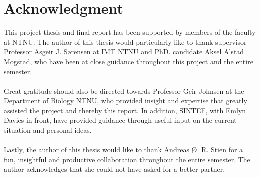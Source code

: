 \chapter*{Acknowledgment}
This project thesis and final report has been supported by members of the faculty at NTNU. The author of this thesis would particularly like to thank supervisor Professor Asgeir J. S{\o}rensen at IMT NTNU and PhD. candidate Aksel Alstad Mogstad, who have been at close guidance throughout this project and the entire semester. 
\\\\
Great gratitude should also be directed towards Professor Geir Johnsen at the Department of Biology NTNU, who provided insight and expertise that greatly assisted the project and thereby this report. In addition, SINTEF, with Emlyn Davies in front, have provided guidance through useful input on the current situation and personal ideas.  
\\\\
Lastly, the author of this thesis would like to thank Andreas {\O}. R. Stien for a fun, insightful and productive collaboration throughout the entire semester. The author acknowledges that she could not have asked for a better partner. 
